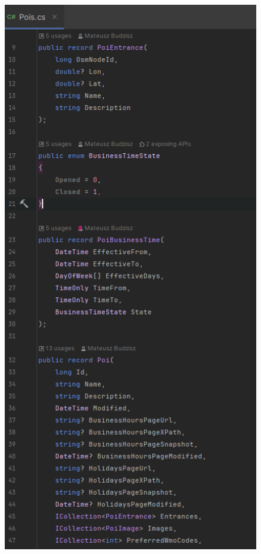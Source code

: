 \begin{itemize}
\begin{figure}[H]
            \includegraphics[width=1\textwidth]{attachments/PoisDomain}

\end{figure}
\end{itemize}
